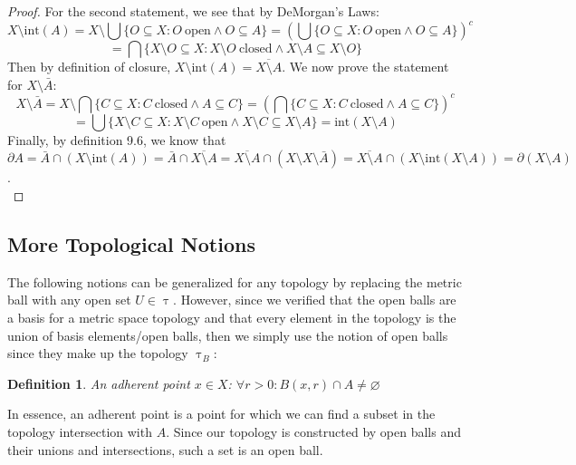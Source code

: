 \documentclass{article}
\newtheorem{defn}{Definition}[section]
\begin{document}
\begin{proof}
For the second statement, we see that by DeMorgan's Laws:
\begin{equation*}
    X \setminus \text{int}(A) = X \setminus \bigcup \{O \subseteq X: O \ \text{open} \land O \subseteq A\} = (\bigcup \{O \subseteq X: O \ \text{open} \land O \subseteq A\})^c
\end{equation*}
\begin{equation*}
    = \bigcap\{X \setminus O \subseteq X: X \setminus O \ \text{closed} \land X \setminus A \subseteq X \setminus O\}
\end{equation*}
Then by definition of closure, $X \setminus \text{int}(A) = \overline{X \setminus A}$. We now prove the statement for $X \setminus \bar{A}$:
\begin{equation*}
    X \setminus \bar{A} = X \setminus \bigcap\{C \subseteq X: C \ \text{closed} \land A \subseteq C\} = (\bigcap\{C \subseteq X: C \ \text{closed} \land A \subseteq C\})^c
\end{equation*}
\begin{equation*}
    = \bigcup\{X \setminus C \subseteq X: X \setminus C \ \text{open} \land X \setminus C \subseteq X \setminus A\} = \text{int}(X \setminus A)
\end{equation*}
Finally, by definition 9.6, we know that $\partial A = \bar{A} \cap (X \setminus \text{int}(A)) = \bar{A} \cap \overline{X \setminus A} = \overline{X \setminus A} \cap (X \setminus X \setminus \bar{A}) = \overline{X \setminus A} \cap (X \setminus \text{int}(X \setminus A)) = \partial(X \setminus A)$.\\
\end{proof}

\medskip
\subsection{More Topological Notions}
The following notions can be generalized for any topology by replacing the metric ball with any open set $U \in \uptau$. However, since we verified that the open balls are a basis for a metric space topology and that every element in the topology is the union of basis elements/open balls, then we simply use the notion of open balls since they make up the topology $\uptau_B$:\\

\begin{defn}
An adherent point $x \in X$: $\forall r > 0: B(x, r) \cap A \neq \varnothing$
\end{defn}
In essence, an adherent point is a point for which we can find a subset in the topology intersection with $A$. Since our topology is constructed by open balls and their unions and intersections, such a set is an open ball.\\
\end{document}
